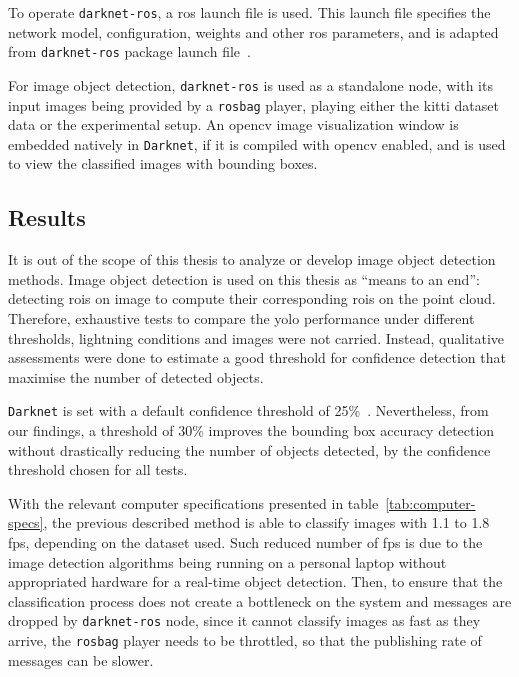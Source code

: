 To operate \texttt{darknet-ros}, a \ac{ros} launch file is used. This launch file specifies the network model, configuration, weights and other \ac{ros} parameters, and is adapted from \texttt{darknet-ros} package launch file~\cite{MarkoBjelonic}. 

For image object detection, \texttt{darknet-ros} is used as a standalone node, with its input images being provided by a \texttt{rosbag} player, playing either the \ac{kitti} dataset data or the experimental setup. An \ac{opencv} image visualization window is embedded natively in \texttt{Darknet}, if it is compiled with \ac{opencv} enabled, and is used to view the classified images with bounding boxes.


\subsection{Results}
\label{subsec:object-detection:image-results}
It is out of the scope of this thesis to analyze or develop image object detection methods. Image object detection is used on this thesis as ``means to an end'': detecting \acp{roi} on image to compute their corresponding \acp{roi} on the point cloud. Therefore, exhaustive tests to compare the \ac{yolo} performance under different thresholds, lightning conditions and images were not carried. Instead, qualitative assessments were done to estimate a good threshold for confidence detection that maximise the number of detected objects.

\texttt{Darknet} is set with a default confidence threshold of 25\%~\cite{Redmon2016}. Nevertheless, from our findings, a threshold of 30\% improves the bounding box accuracy detection without drastically reducing the number of objects detected, by the confidence threshold chosen for all tests.

With the relevant computer specifications presented in table~\ref{tab:computer-specs}, the previous described method is able to classify images with 1.1 to 1.8 \ac{fps}, depending on the dataset used. Such reduced number of \ac{fps} is due to the image detection algorithms being running on a personal laptop without appropriated hardware for a real-time object detection. Then, to ensure that the classification process does not create a bottleneck on the system and messages are dropped by \texttt{darknet-ros} node, since it cannot classify images as fast as they arrive, the \texttt{rosbag} player needs to be throttled, so that the publishing rate of messages can be slower.

